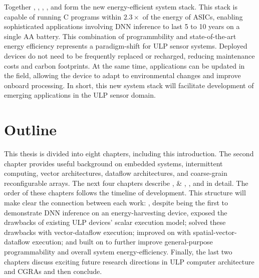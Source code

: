 Together \sonic, \manic, \msilicon, \snafu, and \riptide form the new energy-efficient system stack.
% 
This stack is capable of running C programs within $2.3\times$ of the energy of ASICs, enabling sophisticated applications involving DNN inference to last 5 to 10 years on a single AA battery.
% 
This combination of programmbility and state-of-the-art energy efficiency represents a paradigm-shift for ULP sensor systems.
% 
Deployed devices do not need to be frequently replaced or recharged, reducing maintenance costs and carbon footprints.
% 
At the same time, applications can be updated in the field, allowing the device to adapt to environmental changes and improve onboard processing.
% 
% 
In short, this new system stack will facilitate development of emerging applications in the ULP sensor domain.

\section{Outline}
This thesis is divided into eight chapters, including this introduction.
%
The second chapter provides useful background on embedded systems, intermittent computing, vector architectures, dataflow architectures, and coarse-grain reconfigurable arrays.
% 
The next four chapters describe \sonic, \manic \& \msilicon, \snafu, and \riptide in detail.
% 
The order of these chapters follows the timeline of development.
% 
This structure will make clear the connection between each work:
% 
\sonic, despite being the first to demonstrate DNN inference on an energy-harvesting device, exposed the drawbacks of existing ULP devices' scalar execution model; \manic solved these drawbacks with vector-dataflow execution; \snafu improved on \manic with spatial-vector-dataflow execution; and \riptide built on \snafu to further improve general-purpose programmability and overall system energy-efficiency.
% 
Finally, the last two chapters discuss exciting future research directions in ULP computer architecture and CGRAs and then conclude.
